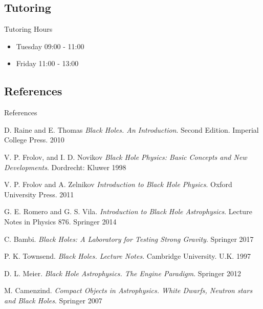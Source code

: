 \documentclass{beamer}
\begin{document}
    \subsection{Tutoring}  
    \begin{frame}{Tutoring Hours}
    	\begin{itemize}
        	\item Tuesday 09:00 - 11:00
            \item Friday 11:00 - 13:00
       	\end{itemize}         
      \bigskip
    \end{frame}
    
    \subsection{References}
    \begin{frame}[allowframebreaks]{References}
      \begin{thebibliography}{9}
        
            D. Raine and E. Thomas  
            \emph{Black Holes. An Introduction}. 
            Second Edition. Imperial College Press. 2010
            
            V. P. Frolov, and I. D. Novikov \emph{Black Hole Physics: Basic Concepts and New Developments}. 
            Dordrecht: Kluwer 1998
            
            V. P. Frolov and A. Zelnikov 
            \emph{Introduction to Black Hole Physics}. 
            Oxford University Press. 2011
            
            G. E. Romero and G. S. Vila.  
            \emph{Introduction to Black Hole Astrophysics}. 
            Lecture Notes in Physics 876. Springer 2014
            
            C. Bambi. 
            \emph{Black Holes: A Laboratory for Testing Strong Gravity}. 
            Springer 2017
         
         	P. K. Townsend.  
            \emph{Black Holes. Lecture Notes}. 
            Cambridge University. U.K. 1997
            
          	D. L. Meier. 
            \emph{Black Hole Astrophysics. The Engine Paradigm}. 
            Springer 2012
          
          	M. Camenzind. 
            \emph{Compact Objects in Astrophysics. White Dwarfs, Neutron stars and Black Holes}. 
            Springer 2007  
    	\end{thebibliography}
    \end{frame}
    
\end{document}
